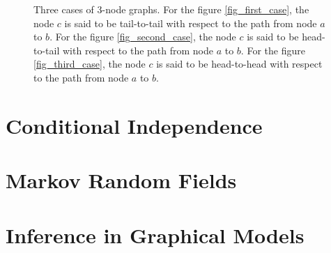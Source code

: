 \documentclass[12pt, a4paper]{article}
\begin{document}
\begin{itemize}
\begin{figure}[htbp]
            \hfil
            \caption{Three cases of 3-node graphs. For the figure \ref{fig_first_case}, the node $c$
            is said to be tail-to-tail with respect to the path from node $a$ to $b$. 
            For the figure \ref{fig_second_case}, the node $c$
            is said to be head-to-tail with respect to the path from node $a$ to $b$.
            For the figure \ref{fig_third_case}, the node $c$
            is said to be head-to-head with respect to the path from node $a$ to $b$.}
            \label{fig:threecases}
        \end{figure}
    \end{itemize}


    \section{Conditional Independence}
    \section{Markov Random Fields}
    \section{Inference in Graphical Models}
\end{document}
